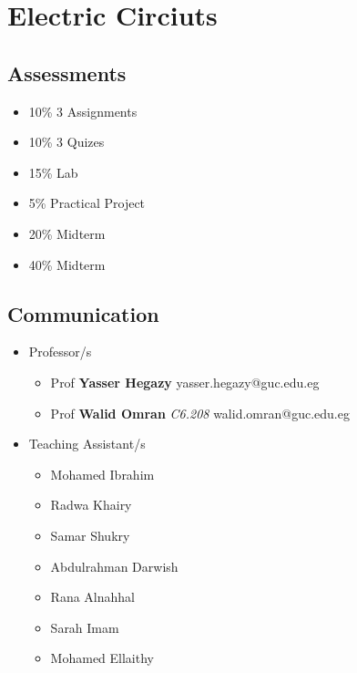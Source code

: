 \documentclass[11pt]{article}
\begin{document}
\section{Electric Circiuts}
\begin{multicols}{2}
\subsection{Assessments}

\begin{itemize}
	\item 10\% 3 Assignments
\item 10\% 3 Quizes 
\item 15\% Lab
\item 5\% Practical Project
\item 20\% Midterm
\item 40\% Midterm
\end{itemize}
\subsection{Communication}
\begin{itemize}

\item Professor/s 
\begin{itemize}

	\item Prof \textbf{Yasser Hegazy} \textit{} yasser.hegazy@guc.edu.eg  
	\item Prof \textbf{Walid Omran} \textit{C6.208} walid.omran@guc.edu.eg  

\end{itemize}
\item Teaching Assistant/s
\begin{itemize}

\item Mohamed Ibrahim
\item Radwa Khairy
\item Samar Shukry
\item Abdulrahman Darwish
\item Rana Alnahhal
\item Sarah Imam
\item Mohamed Ellaithy
\end{itemize}
\end{itemize}
\end{multicols}
\end{document}
